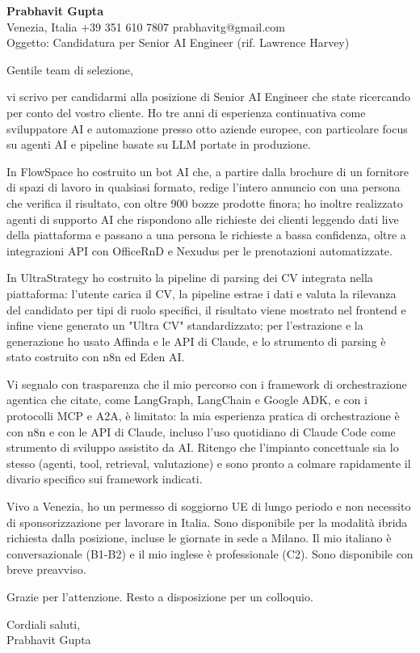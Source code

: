 \documentclass[a4paper,10.5pt]{article}
\begin{document}
\textbf{Prabhavit Gupta}\\
Venezia, Italia \textbar{} +39 351 610 7807 \textbar{} prabhavitg@gmail.com\\[10pt]
Oggetto: Candidatura per Senior AI Engineer (rif. Lawrence Harvey)

Gentile team di selezione,

vi scrivo per candidarmi alla posizione di Senior AI Engineer che state ricercando per conto del vostro cliente. Ho tre anni di esperienza continuativa come sviluppatore AI e automazione presso otto aziende europee, con particolare focus su agenti AI e pipeline basate su LLM portate in produzione.

In FlowSpace ho costruito un bot AI che, a partire dalla brochure di un fornitore di spazi di lavoro in qualsiasi formato, redige l'intero annuncio con una persona che verifica il risultato, con oltre 900 bozze prodotte finora; ho inoltre realizzato agenti di supporto AI che rispondono alle richieste dei clienti leggendo dati live della piattaforma e passano a una persona le richieste a bassa confidenza, oltre a integrazioni API con OfficeRnD e Nexudus per le prenotazioni automatizzate.

In UltraStrategy ho costruito la pipeline di parsing dei CV integrata nella piattaforma: l'utente carica il CV, la pipeline estrae i dati e valuta la rilevanza del candidato per tipi di ruolo specifici, il risultato viene mostrato nel frontend e infine viene generato un "Ultra CV" standardizzato; per l'estrazione e la generazione ho usato Affinda e le API di Claude, e lo strumento di parsing è stato costruito con n8n ed Eden AI.

Vi segnalo con trasparenza che il mio percorso con i framework di orchestrazione agentica che citate, come LangGraph, LangChain e Google ADK, e con i protocolli MCP e A2A, è limitato: la mia esperienza pratica di orchestrazione è con n8n e con le API di Claude, incluso l'uso quotidiano di Claude Code come strumento di sviluppo assistito da AI. Ritengo che l'impianto concettuale sia lo stesso (agenti, tool, retrieval, valutazione) e sono pronto a colmare rapidamente il divario specifico sui framework indicati.

Vivo a Venezia, ho un permesso di soggiorno UE di lungo periodo e non necessito di sponsorizzazione per lavorare in Italia. Sono disponibile per la modalità ibrida richiesta dalla posizione, incluse le giornate in sede a Milano. Il mio italiano è conversazionale (B1-B2) e il mio inglese è professionale (C2). Sono disponibile con breve preavviso.

Grazie per l'attenzione. Resto a disposizione per un colloquio.

Cordiali saluti,\\
Prabhavit Gupta
\end{document}
